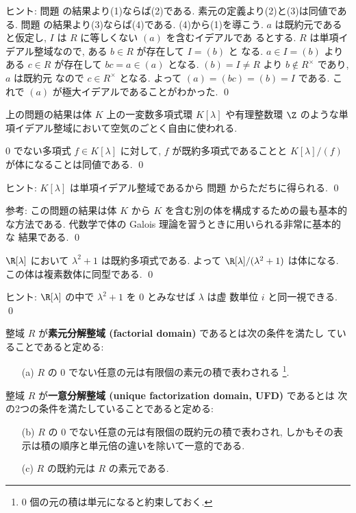 \documentclass[12pt,twoside]{jarticle}
\begin{document}
\noindent
ヒント: 問題  の結果より(1)ならば(2)である.
素元の定義より(2)と(3)は同値である.
問題  の結果より(3)ならば(4)である.
(4)から(1)を導こう. 
$a$ は既約元であると仮定し, $I$ は $R$ に等しくない $(a)$ を含むイデアルであ
るとする. $R$ は単項イデアル整域なので, ある $b\in R$ が存在して $I=(b)$ と
なる. $a\in I=(b)$ よりある $c\in R$ が存在して $bc=a\in(a)$ となる.
$(b)=I\ne R$ より $b\not\in R^\times$ であり, $a$ は既約元
なので $c\in R^\times$ となる. よって $(a)=(bc)=(b)=I$ である.
これで $(a)$ が極大イデアルであることがわかった.
\qed

\medskip

上の問題の結果は体 $K$ 上の一変数多項式環 $K[\lambda]$ 
や有理整数環 $\Z$ のような単項イデアル整域において空気のごとく自由に使われる.


\begin{question}
  $0$ でない多項式 $f\in K[\lambda]$ に対して, 
  $f$ が既約多項式であることと $K[\lambda]/(f)$ が体になることは同値である.
  \qed
\end{question}

\noindent
ヒント: $K[\lambda]$ は単項イデアル整域であるから
問題  からただちに得られる.
\qed

\medskip
\noindent
参考: この問題の結果は体 $K$ から $K$ を含む別の体を構成するための最も基本的
な方法である.  代数学で体の Galois 理論を習うときに用いられる非常に基本的な
結果である.
\qed


\begin{question}
  $\R[\lambda]$ において $\lambda^2+1$ は既約多項式である.
  よって $\R[\lambda]/(\lambda^2+1)$ は体になる.
  この体は複素数体に同型である. 
  \qed
\end{question}

\noindent
ヒント: $\R[\lambda]$ の中で $\lambda^2+1$ を $0$ とみなせば $\lambda$ は虚
数単位 $i$ と同一視できる.
\qed

\medskip

整域 $R$ が{\bf 素元分解整域 (factorial domain)} であるとは次の条件を満たし
ていることであると定める:
\begin{enumerate}
\item[(a)] $R$ の $0$ でない任意の元は有限個の素元の積で表わされる%
  \footnote{$0$ 個の元の積は単元になると約束しておく.}.
\end{enumerate}
整域 $R$ が{\bf 一意分解整域 (unique factorization domain, UFD)} であるとは
次の2つの条件を満たしていることであると定める:
\begin{enumerate}
\item[(b)] $R$ の $0$ でない任意の元は有限個の既約元の積で表わされ, 
  しかもその表示は積の順序と単元倍の違いを除いて一意的である.
\item[(c)] $R$ の既約元は $R$ の素元である.
\end{enumerate}
\end{document}
